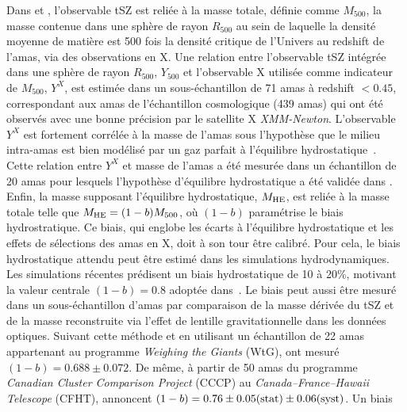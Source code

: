 Dans \citet{Planck_2014_SZ_cosmo} et \citet{Planck_2016_SZ_cosmo},
l'observable tSZ est reliée à la masse totale, définie comme
$M_{500}$, la masse contenue dans une sphère de rayon $R_{500}$ au
sein de laquelle la densité moyenne de matière est 500 fois la
densité critique de l'Univers au redshift de l'amas, via des
observations en X. 
Une relation entre l'observable tSZ intégrée dans une sphère de rayon
$R_{500}$, $Y_{500}$ et l'observable X utilisée comme indicateur de 
$M_{500}$, $Y^{X}$, est estimée dans un sous-échantillon de 71 amas à
redshift $<0.45$, correspondant aux amas de l'échantillon cosmologique
(439 amas) qui ont été observés avec une bonne précision par le satellite
X \emph{XMM-Newton}. L'observable $Y^{X}$ est fortement corrélée à la
masse de l'amas sous l'hypothèse que le milieu intra-amas est bien
modélisé par un gaz parfait à l'équilibre
hydrostatique~\citep{Kravtsov2006}. Cette relation entre $Y^{X}$ et
masse de l'amas a été mesurée dans un échantillon de 20 amas pour lesquels
l'hypothèse d'équilibre hydrostatique a été validée dans \citet{Arnaud2010}.
Enfin, la masse supposant l'équilibre hydrostatique, $M_{\rm{HE}}$,
est reliée à la masse totale telle que $M_{\rm{HE}} = (1-b)M_{500}$,
où $(1-b)$ paramétrise le biais hydrostratique. Ce biais, qui englobe les écarts à
l'équilibre hydrostatique et les effets de sélections des amas en X, doit à son
tour être calibré. Pour cela, le biais hydrostatique attendu peut être
estimé dans les simulations hydrodynamiques. Les simulations récentes
prédisent un biais hydrostatique de 10 à 20\%, motivant la valeur
centrale $(1 - b) = 0.8$ adoptée dans~\citet{Planck_2014_SZ_Cosmo}. Le
biais peut aussi être mesuré dans un sous-échantillon d'amas par
comparaison de la masse dérivée du tSZ et de la masse reconstruite via
l'effet de lentille gravitationnelle dans les données
optiques. Suivant cette méthode et en utilisant un échantillon de 22
amas appartenant au programme \emph{Weighing the Giants}
(WtG), \citet{vonderLinden2014} ont mesuré $(1-b) = 0.688 \pm
0.072$. De même, à partir de 50 amas du programme \emph{Canadian
Cluster Comparison Project} (CCCP) au \emph{Canada–France–Hawaii
Telescope} (CFHT), \citet{Hoekstra2015} annoncent
$(1-b) = 0.76 \pm 0.05\rm{(stat)} \pm 0.06\rm{(syst)}$. Un biais

